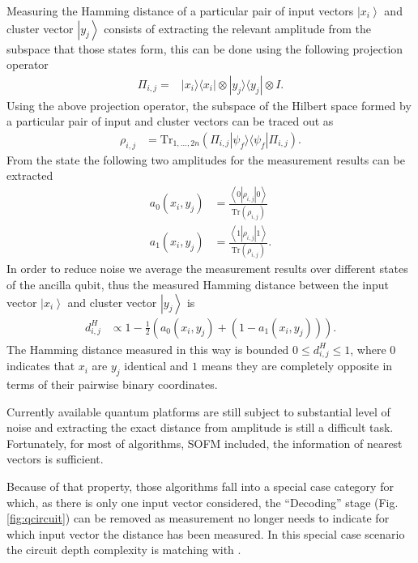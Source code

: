 \documentclass[pra,showkeys,twocolumn,showpacs]{revtex4-1}
\begin{document}
Measuring the Hamming distance of a particular pair of input vectors $\left| x_i \right\rangle$ and cluster vector $\left| y_j \right\rangle$ consists of extracting the relevant amplitude from the subspace that those states form, 
this can be done using the following projection operator
%
\begin{align}
\Pi_{i,j} = &\left| x_i \rangle\langle x_i \right| \otimes \left| y_j \rangle\langle y_j \right| \otimes I .
\end{align} 
%
Using the above projection operator, the subspace of the Hilbert space formed by a particular pair of input and cluster vectors can be traced out as
%
\begin{align}
    \rho_{i,j} &= \text{Tr}_{1,\dots,2n} (\Pi_{i,j} \left| \psi_f \rangle\langle \psi_f \right| \Pi_{i,j}) .
\end{align}
%
From the state the following two amplitudes for the measurement results can be extracted
%
\begin{align}
    a_0(x_i,y_j) & = \frac{\left\langle 0 |\rho_{i,j}| 0 \right\rangle}{\text{Tr}(\rho_{i,j})}  \\
    a_1(x_i,y_j) & = \frac{\left\langle 1 |\rho_{i,j}| 1 \right\rangle}{\text{Tr}(\rho_{i,j})} .
\end{align}
%
In order to reduce noise we average the measurement results over different states of the ancilla qubit, 
thus the measured Hamming distance between the input vector $\left| x_i \right\rangle$ and cluster vector $\left| y_j \right\rangle$ is
%
\begin{align}
    d_{i,j}^H & \propto 1 - \frac{1}{2}(a_0(x_i,y_j) + (1-a_1(x_i,y_j))) .
\end{align}
%
The Hamming distance measured in this way is bounded $0 \leq d_{i,j}^H \leq 1$, 
where  $0$ indicates that $x_i$ are $y_j$ identical and $1$ means they are completely opposite in terms of their pairwise binary coordinates.

Currently available quantum platforms are still subject to substantial level of noise and extracting the exact distance from amplitude is still a difficult task.
Fortunately, for most of algorithms, SOFM included, the information of nearest vectors is sufficient. 

Because of that property, those algorithms fall into a special case category for which, as there is only one input vector considered, the ``Decoding'' stage (Fig.\ref{fig:qcircuit}) can be removed as measurement no longer needs to indicate for which input vector the distance has been measured.
In this special case scenario the circuit depth complexity is matching with \cite{shuld2014}.
\end{document}
